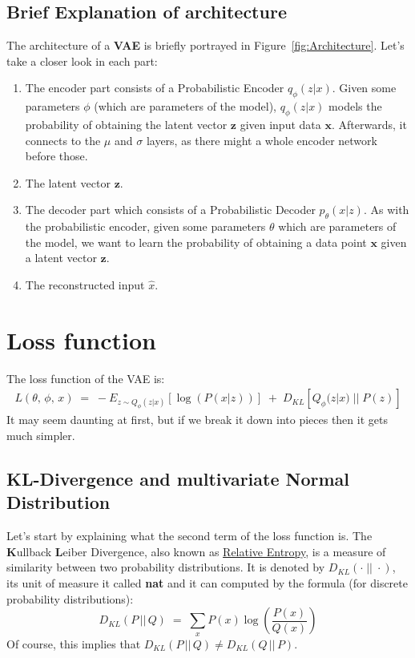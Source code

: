 \documentclass[12pt]{report}
\begin{document}
\subsection*{Brief Explanation of architecture}
The architecture of a \textbf{VAE} is briefly portrayed in 
Figure~\ref{fig:Architecture}. Let's take a closer look in each part:

\begin{enumerate}
    \item The encoder part consists of a Probabilistic Encoder $q_{\phi}(z | x)$.
        Given some parameters $\phi$ (which are parameters of the model),
        $q_{\phi}(z | x)$ models the probability of obtaining the latent vector
        $\textbf{z}$ given input data $\textbf{x}$. Afterwards, it connects to
        the $\mu$ and $\sigma$ layers, as there might a whole encoder network
        before those.
    \item The latent vector $\textbf{z}$.
    \item The decoder part which consists of a Probabilistic Decoder
        $p_{\theta}(x | z)$. As with the probabilistic encoder, given some
        parameters $\theta$ which are parameters of the model, we want to learn
        the probability of obtaining a data point $\textbf{x}$ given a latent
        vector $\textbf{z}$.
    \item The reconstructed input $\hat{x}$.
\end{enumerate}
\clearpage

\section*{Loss function}
The loss function of the VAE is:
\begin{align*}
    L(\theta,\, \phi,\, x) \;=\; -E_{z \sim Q_{\phi}(z | x)}
                                    \left[\log(P(x | z)) \right]\;
                              +\; D_{KL}\left[Q_{\phi}(z | x) \;||\; P(z) \right]
\end{align*}
It may seem daunting at first, but if we break it down into pieces then it gets
much simpler.

\subsection*{KL-Divergence and multivariate Normal Distribution}
Let's start by explaining what the second term of the loss function is. The
\textbf{K}ullback \textbf{L}eiber Divergence, also known as
\href{https://en.wikipedia.org/wiki/Relative_entropy}{Relative Entropy}, is
a measure of similarity between two probability distributions. It is denoted by
$D_{KL}(\cdot \;||\; \cdot)$, its unit of measure it called \textbf{nat} and it
can computed by the formula (for discrete probability distributions):
\begin{equation}\label{eq:KLD}
    D_{KL} (P \,||\, Q) \;=\; \sum_x P(x) \log\left(\frac{P(x)}{Q(x)}\right)
\end{equation}
Of course, this implies that $D_{KL} (P \,||\, Q) \neq D_{KL} (Q \,||\, P)$.
\bigskip
\end{document}

